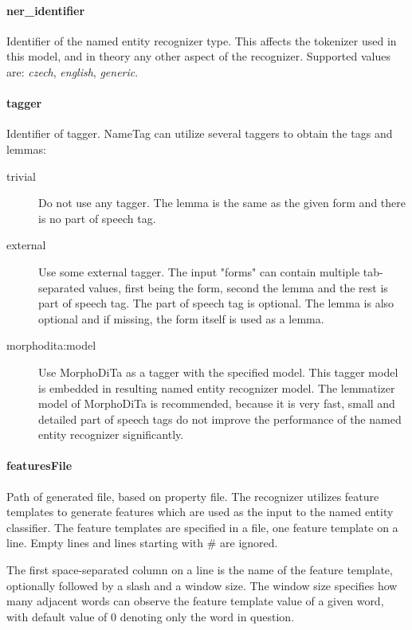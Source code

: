 \paragraph{ner\_identifier}
Identifier of the named entity recognizer type. This affects the tokenizer used
in this model, and in theory any other aspect of the recognizer. Supported values
are: \emph{czech}, \emph{english}, \emph{generic}.

\paragraph{tagger}
Identifier of tagger. NameTag can utilize several taggers to obtain the tags and lemmas:

\begin{description}
\item[trivial]
Do not use any tagger. The lemma is the same as the given form and there is no
part of speech tag.
\item[external]
Use some external tagger. The input "forms" can contain multiple tab-separated
values, first being the form, second the lemma and the rest is part of speech tag.
The part of speech tag is optional. The lemma is also optional and if missing,
the form itself is used as a lemma.
\item[morphodita:model]
Use MorphoDiTa as a tagger with the specified model. This tagger model is embedded
in resulting named entity recognizer model. The lemmatizer model of MorphoDiTa
is recommended, because it is very fast, small and detailed part of speech tags
do not improve the performance of the named entity recognizer significantly.
\end{description}

\paragraph{featuresFile}
Path of generated file, based on property file.
The recognizer utilizes feature templates to generate features which are used as
the input to the named entity classifier. The feature templates are specified in
a file, one feature template on a line. Empty lines and lines starting with \# are ignored.

The first space-separated column on a line is the name of the feature template,
optionally followed by a slash and a window size. The window size specifies how
many adjacent words can observe the feature template value of a given word, with
default value of 0 denoting only the word in question.

